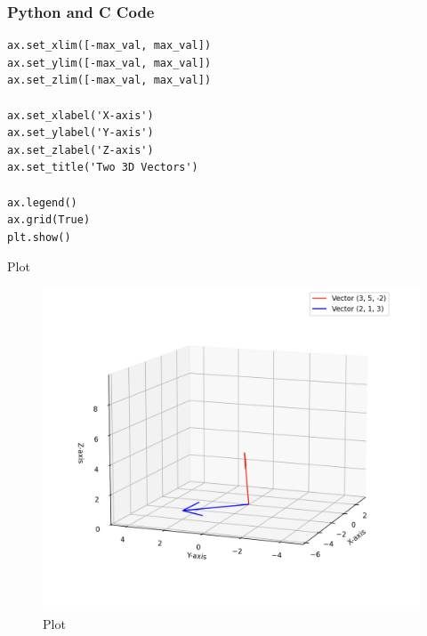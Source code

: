 \documentclass{beamer}
\begin{document}
\begin{frame}[fragile]
\frametitle{Python and C Code}

\begin{lstlisting}
ax.set_xlim([-max_val, max_val])
ax.set_ylim([-max_val, max_val])
ax.set_zlim([-max_val, max_val])

ax.set_xlabel('X-axis')
ax.set_ylabel('Y-axis')
ax.set_zlabel('Z-axis')
ax.set_title('Two 3D Vectors')

ax.legend()
ax.grid(True)
plt.show()
\end{lstlisting}

\end{frame}


\begin{frame}{Plot}
\begin{figure}
    \centering
    \includegraphics[width=0.8\columnwidth]{Figs/Figure_4.png}
    \caption{Plot}
    \label{fig:placeholder}
\end{figure}
\end{frame}
\end{document}
